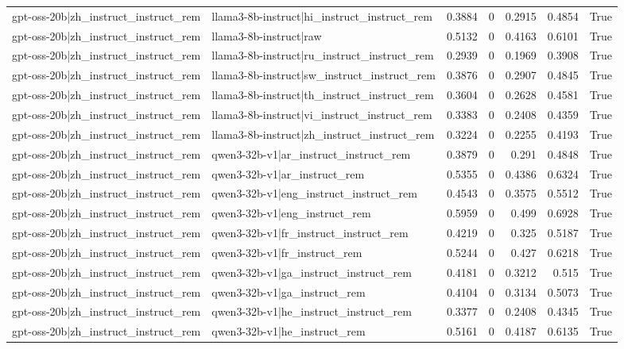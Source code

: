 \begin{table}
\begin{tabular}{l l r r r r l}
gpt-oss-20b|zh_instruct_instruct_rem & llama3-8b-instruct|hi_instruct_instruct_rem & 0.3884 & 0 & 0.2915 & 0.4854 & True \\
gpt-oss-20b|zh_instruct_instruct_rem & llama3-8b-instruct|raw & 0.5132 & 0 & 0.4163 & 0.6101 & True \\
gpt-oss-20b|zh_instruct_instruct_rem & llama3-8b-instruct|ru_instruct_instruct_rem & 0.2939 & 0 & 0.1969 & 0.3908 & True \\
gpt-oss-20b|zh_instruct_instruct_rem & llama3-8b-instruct|sw_instruct_instruct_rem & 0.3876 & 0 & 0.2907 & 0.4845 & True \\
gpt-oss-20b|zh_instruct_instruct_rem & llama3-8b-instruct|th_instruct_instruct_rem & 0.3604 & 0 & 0.2628 & 0.4581 & True \\
gpt-oss-20b|zh_instruct_instruct_rem & llama3-8b-instruct|vi_instruct_instruct_rem & 0.3383 & 0 & 0.2408 & 0.4359 & True \\
gpt-oss-20b|zh_instruct_instruct_rem & llama3-8b-instruct|zh_instruct_instruct_rem & 0.3224 & 0 & 0.2255 & 0.4193 & True \\
gpt-oss-20b|zh_instruct_instruct_rem & qwen3-32b-v1|ar_instruct_instruct_rem & 0.3879 & 0 & 0.291 & 0.4848 & True \\
gpt-oss-20b|zh_instruct_instruct_rem & qwen3-32b-v1|ar_instruct_rem & 0.5355 & 0 & 0.4386 & 0.6324 & True \\
gpt-oss-20b|zh_instruct_instruct_rem & qwen3-32b-v1|eng_instruct_instruct_rem & 0.4543 & 0 & 0.3575 & 0.5512 & True \\
gpt-oss-20b|zh_instruct_instruct_rem & qwen3-32b-v1|eng_instruct_rem & 0.5959 & 0 & 0.499 & 0.6928 & True \\
gpt-oss-20b|zh_instruct_instruct_rem & qwen3-32b-v1|fr_instruct_instruct_rem & 0.4219 & 0 & 0.325 & 0.5187 & True \\
gpt-oss-20b|zh_instruct_instruct_rem & qwen3-32b-v1|fr_instruct_rem & 0.5244 & 0 & 0.427 & 0.6218 & True \\
gpt-oss-20b|zh_instruct_instruct_rem & qwen3-32b-v1|ga_instruct_instruct_rem & 0.4181 & 0 & 0.3212 & 0.515 & True \\
gpt-oss-20b|zh_instruct_instruct_rem & qwen3-32b-v1|ga_instruct_rem & 0.4104 & 0 & 0.3134 & 0.5073 & True \\
gpt-oss-20b|zh_instruct_instruct_rem & qwen3-32b-v1|he_instruct_instruct_rem & 0.3377 & 0 & 0.2408 & 0.4345 & True \\
gpt-oss-20b|zh_instruct_instruct_rem & qwen3-32b-v1|he_instruct_rem & 0.5161 & 0 & 0.4187 & 0.6135 & True \\

\end{tabular}
\end{table}
